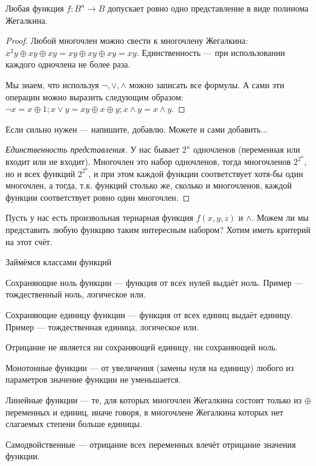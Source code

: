 \begin{theorem}
	Любая функция $f : B^n \to B$ допускает ровно одно представление в виде полинома Жегалкина. 
\end{theorem}

\begin{proof}
	Любой многочлен можно свести к многочлену Жегалкина: $x^2y \oplus xy \oplus xy = xy \oplus xy \oplus xy = xy$. Единственность --- при использовании каждого одночлена не более раза. 

	Мы знаем, что используя $\lnot, \lor, \land$ можно записать все формулы. А сами эти операции можно выразить следующим образом: $\lnot x = x \oplus 1; x \lor y = xy \oplus x \oplus y; x \land y = x \land y$.
\end{proof}
\begin{example}
	Если сильно нужен --- напишите, добавлю. Можете и сами добавить...
\end{example}
\begin{proof}[Единственность представления]
	У нас бывает $2^n$ одночленов (переменная или входит или не входит). Многочлен это набор одночленов, тогда многочленов $2^{2^n}$, но и всех функций $2^{2^n}$, и при этом каждой функции соответствует хотя-бы один многочлен, а тогда, т.к. функций столько же, сколько и многочленов, каждой функции соответствует ровно один многочлен.
\end{proof}

Пусть у нас есть произвольная тернарная функция $f(x, y, z)$ и $\land$. Можем ли мы представить любую функцию таким интересным набором? Хотим иметь критерий на этот счёт. 

Займёмся классами функций
\begin{definition}
	Сохраняющие ноль функции --- функция от всех нулей выдаёт ноль. Пример --- тождественный ноль, логическое или.

	Сохраняющие единицу функции --- функция от всех единиц выдаёт единицу. Пример --- тождественная единица, логическое или.

	Отрицание не является ни сохраняющей единицу, ни сохраняющей ноль.

	Монотонные функции --- от увеличения (замены нуля на единицу) любого из параметров значение функции не уменьшается. 

	Линейные функции --- те, для которых многочлен Жегалкина состоит только из $\oplus$ переменных и единиц, иначе говоря, в многочлене Жегалкина которых нет слагаемых степени больше единицы.

	Самодвойственные --- отрицание всех переменных влечёт отрицание значения функции. 
\end{definition}

